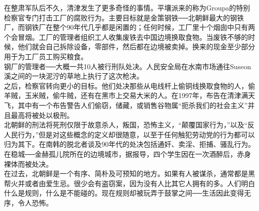 在整肃军队后不久，清津发生了更多奇怪的事情。平壤派来的称为Groupa的特别检察官专门打击工厂的腐败行为。主要目标就是金策钢铁──北朝鲜最大的钢铁厂，而钢铁厂在整个90年代几乎都是闲置的；任何时候，工厂里十个烟囱中只有两个会冒烟。工厂的管理者组织工人收集废铁去中国边境换取食物。当废铁不够的时候，他们就会自己拆除设备，零部件，然后都在边境被卖掉。换来的现金至少部分用于为工厂员工购买粮食。\\

钢厂的管理者──大概一共10人被行刑队处决。人民安全局在水南市场通往Suseon溪之间的一块泥泞的草地上执行了这次枪决。\\

之后，检察官转向更小的目标。他们处决那些从电线杆上偷铜线换取食物的人，偷羊贼，玉米贼，偷牛贼，还有在黑市上交易大米的人。在1997年，布告在清津满天飞，其中有一个布告警告人们偷窃，储藏，或销售谷物属“扼杀我们的社会主义”并且最高将被处以极刑。\\

北朝鲜的刑法将死刑仅限于故意杀人，叛国，恐怖主义，“颠覆国家行为，”以及“反人民行为，”但是对这些概念的定义却很随意，以至于任何触犯劳动党的行为都可以归为其下。在南韩的脱北者谈及90年代的处决包括通奸、卖淫、拒捕、骚乱行为。在稳城──金赫孤儿院所在的边境城市，据报导，四个学生因在一次酒醉后，赤身裸体而被处决。\\

在过去，北朝鲜是一个有序、简朴及可预知的地方。如果有人被谋杀，通常都是黑帮火并或者由爱生忌。很少会有盗窃案，因为没有人比其它人拥有的多。人们明白什么是规则，什么是不能碰的。现在规则却被玩弄于鼓掌之间──生活因此变得无序，令人恐怖。\\
